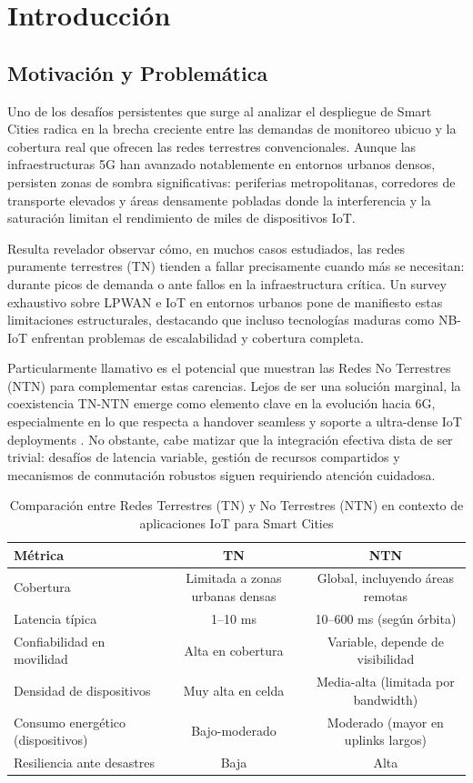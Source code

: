 \section{Introducción}

\subsection{Motivación y Problemática}

Uno de los desafíos persistentes que surge al analizar el despliegue de Smart Cities radica en la brecha creciente entre las demandas de monitoreo ubicuo y la cobertura real que ofrecen las redes terrestres convencionales. Aunque las infraestructuras 5G han avanzado notablemente en entornos urbanos densos, persisten zonas de sombra significativas: periferias metropolitanas, corredores de transporte elevados y áreas densamente pobladas donde la interferencia y la saturación limitan el rendimiento de miles de dispositivos IoT. 

Resulta revelador observar cómo, en muchos casos estudiados, las redes puramente terrestres (TN) tienden a fallar precisamente cuando más se necesitan: durante picos de demanda o ante fallos en la infraestructura crítica. Un survey exhaustivo sobre LPWAN e IoT en entornos urbanos \cite{Ogbodo2022} pone de manifiesto estas limitaciones estructurales, destacando que incluso tecnologías maduras como NB-IoT enfrentan problemas de escalabilidad y cobertura completa. 

Particularmente llamativo es el potencial que muestran las Redes No Terrestres (NTN) para complementar estas carencias. Lejos de ser una solución marginal, la coexistencia TN-NTN emerge como elemento clave en la evolución hacia 6G, especialmente en lo que respecta a handover seamless y soporte a ultra-dense IoT deployments \cite{Alsaeedy2025}. No obstante, cabe matizar que la integración efectiva dista de ser trivial: desafíos de latencia variable, gestión de recursos compartidos y mecanismos de conmutación robustos siguen requiriendo atención cuidadosa.

\begin{table}[t]
\centering
\caption{Comparación entre Redes Terrestres (TN) y No Terrestres (NTN) en contexto de aplicaciones IoT para Smart Cities}
\label{tab:tn_vs_ntn}
\begin{tabular}{lcc}
\hline
\textbf{Métrica} & \textbf{TN} & \textbf{NTN} \\
\hline
Cobertura & Limitada a zonas urbanas densas & Global, incluyendo áreas remotas \\
Latencia típica & 1--10 ms & 10--600 ms (según órbita) \\
Confiabilidad en movilidad & Alta en cobertura & Variable, depende de visibilidad \\
Densidad de dispositivos & Muy alta en celda & Media-alta (limitada por bandwidth) \\
Consumo energético (dispositivos) & Bajo-moderado & Moderado (mayor en uplinks largos) \\
Resiliencia ante desastres & Baja & Alta \\
\hline
\end{tabular}
\end{table}

